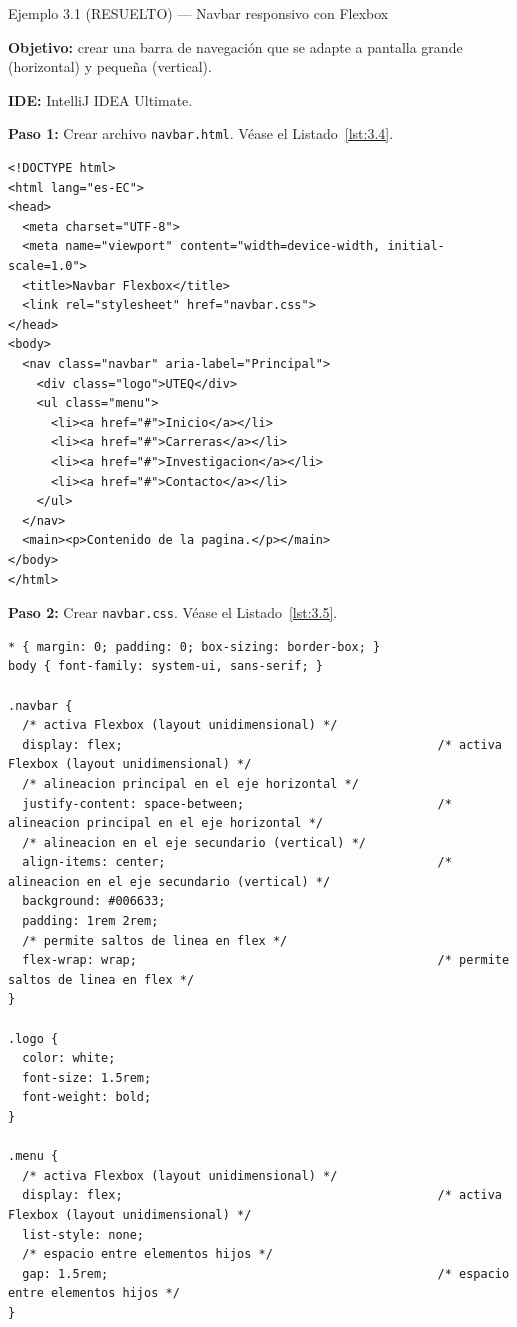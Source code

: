\documentclass[11pt,a4paper,openany]{book}
\begin{document}
\begin{cajaejemplo}{Ejemplo 3.1 (RESUELTO) --- Navbar responsivo con Flexbox}

\textbf{Objetivo:} crear una barra de navegación que se adapte a
pantalla grande (horizontal) y pequeña (vertical).

\textbf{IDE:} IntelliJ IDEA Ultimate.

\textbf{Paso 1:} Crear archivo \texttt{navbar.html}. V\'ease el Listado~\ref{lst:3.4}.

\begin{lstlisting}[style=html,caption={navbar.html},label=lst:3.4]
<!DOCTYPE html>
<html lang="es-EC">
<head>
  <meta charset="UTF-8">
  <meta name="viewport" content="width=device-width, initial-scale=1.0">
  <title>Navbar Flexbox</title>
  <link rel="stylesheet" href="navbar.css">
</head>
<body>
  <nav class="navbar" aria-label="Principal">
    <div class="logo">UTEQ</div>
    <ul class="menu">
      <li><a href="#">Inicio</a></li>
      <li><a href="#">Carreras</a></li>
      <li><a href="#">Investigacion</a></li>
      <li><a href="#">Contacto</a></li>
    </ul>
  </nav>
  <main><p>Contenido de la pagina.</p></main>
</body>
</html>
\end{lstlisting}

\textbf{Paso 2:} Crear \texttt{navbar.css}. V\'ease el Listado~\ref{lst:3.5}.

\begin{lstlisting}[style=css,caption={navbar.css},label=lst:3.5]
* { margin: 0; padding: 0; box-sizing: border-box; }
body { font-family: system-ui, sans-serif; }

.navbar {
  /* activa Flexbox (layout unidimensional) */
  display: flex;                                            /* activa Flexbox (layout unidimensional) */
  /* alineacion principal en el eje horizontal */
  justify-content: space-between;                           /* alineacion principal en el eje horizontal */
  /* alineacion en el eje secundario (vertical) */
  align-items: center;                                      /* alineacion en el eje secundario (vertical) */
  background: #006633;
  padding: 1rem 2rem;
  /* permite saltos de linea en flex */
  flex-wrap: wrap;                                          /* permite saltos de linea en flex */
}

.logo {
  color: white;
  font-size: 1.5rem;
  font-weight: bold;
}

.menu {
  /* activa Flexbox (layout unidimensional) */
  display: flex;                                            /* activa Flexbox (layout unidimensional) */
  list-style: none;
  /* espacio entre elementos hijos */
  gap: 1.5rem;                                              /* espacio entre elementos hijos */
}


\end{lstlisting}
\end{cajaejemplo}
\end{document}
